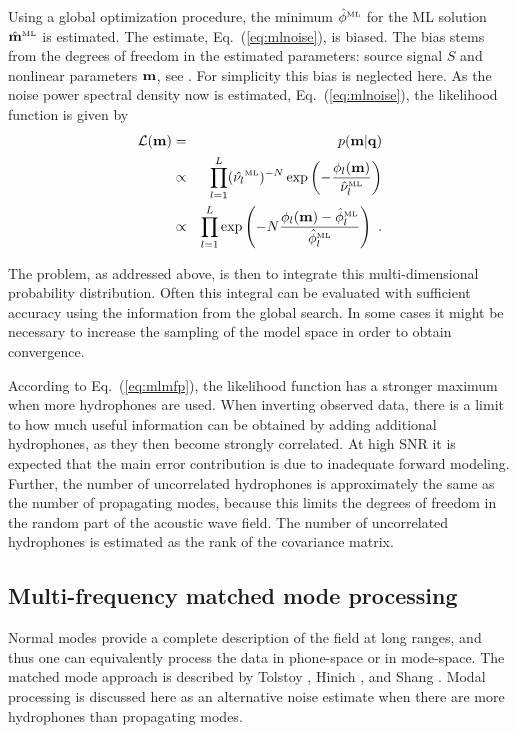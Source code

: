 \documentclass{saclantc}
\newcommand{\ML}[1]{\hat{#1}^{\mbox{\tiny\rm ML}}}
\begin{document}
Using a global optimization procedure, the minimum $\ML{\phi}$ for the ML
solution $\ML{\bf m}$ is estimated. 
The estimate, Eq.~(\ref{eq:mlnoise}), is biased. The bias stems from the degrees
    of freedom in the estimated parameters: source signal $S$ and
    nonlinear parameters ${\bf m}$, see \cite{maiwald:icassp94}.
For simplicity this bias is neglected here.
As the noise power spectral density  now is estimated,
Eq.~(\ref{eq:mlnoise}), 
the likelihood function is given by
\begin{eqnarray}
 {\cal L}({\bf m}) &=& p({\bf m} |{\bf q})  \nonumber \\
 &\propto &
  \prod_{l=1}^{L} (\ML{\nu_l})^{-N} \exp 
       \left( -\frac{\phi_l({\bf m})}{\ML{\nu}_l}\right) \nonumber \\
&\propto& 
  \prod_{l=1}^{L}
       \exp \left( -N\frac{\phi_l({\bf m})-\ML{\phi}_l}
        {\ML{\phi}_l}\right)~.
\label{eq:mlmfp}
\end{eqnarray}

The problem, as addressed above, is then to integrate this 
multi-dimensional probability distribution.  Often this integral can be
evaluated with sufficient accuracy using the information from the
global search. In some cases it might be necessary to increase the
sampling of the model space in order to obtain convergence.

According to Eq.~(\ref{eq:mlmfp}), the likelihood function has a
stronger maximum when more hydrophones are used.  When inverting observed data,
there is a limit to how much useful information can be obtained by
adding additional hydrophones, 
as they  then become strongly correlated.  At high SNR 
it is expected that
the main error contribution is due to inadequate forward modeling. 
Further, the number of uncorrelated hydrophones is approximately the same
as the number of propagating modes, because this limits the degrees of
freedom in the random part of the acoustic wave field.
The number of  uncorrelated hydrophones is estimated as the rank of the
covariance matrix.

\subsection{Multi-frequency matched mode processing}
\label{se:mmp}

Normal modes provide a complete description of the field at long
ranges, and thus one can equivalently process the data in 
phone-space or in mode-space.
The matched mode approach is described by  Tolstoy
\cite{tolstoy}, Hinich \cite{hinich:asa79}, and
Shang \cite{shang:asa85}.
Modal processing is discussed here as an alternative noise 
estimate when there are more hydrophones than propagating modes.
\end{document}
